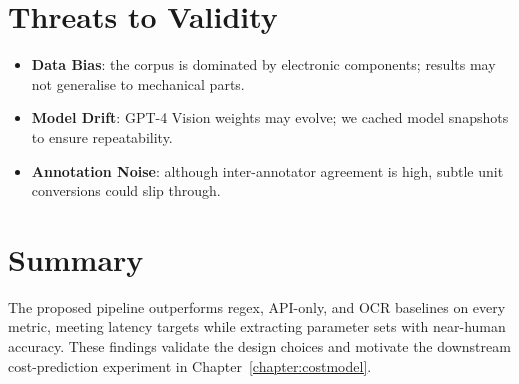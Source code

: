 \section{Threats to Validity}
\begin{itemize}
  \item \textbf{Data Bias}: the corpus is dominated by electronic components; results may not generalise to mechanical parts.
  \item \textbf{Model Drift}: GPT-4 Vision weights may evolve; we cached model snapshots to ensure repeatability.
  \item \textbf{Annotation Noise}: although inter-annotator agreement is high, subtle unit conversions could slip through.
\end{itemize}

\section{Summary}
The proposed pipeline outperforms regex, API-only, and OCR baselines on every metric, meeting latency targets while extracting parameter sets with near-human accuracy.  These findings validate the design choices and motivate the downstream cost-prediction experiment in Chapter~\ref{chapter:costmodel}.